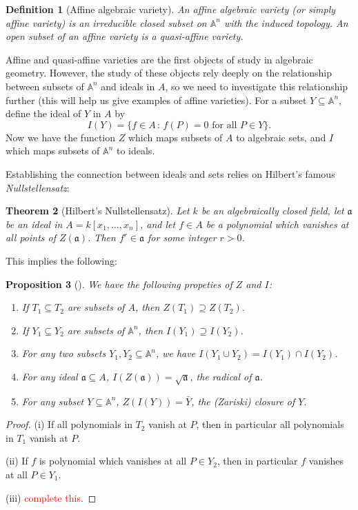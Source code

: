 \documentclass[12pt]{amsart}
\newcommand{\An}{\mathbb{A}^n}
\renewcommand{\a}{\mathfrak{a}}
\newtheorem{theorem}{Theorem}%
\newtheorem{definition}[theorem]{Definition}
\newtheorem{proposition}[theorem]{Proposition}
\theoremstyle{remark}
\theoremstyle{remark}
\begin{document}
\begin{definition}[Affine algebraic variety]
An affine algebraic variety (or simply affine variety) is an irreducible closed subset on $\An$ with the induced topology.
An open subset of an affine variety is a quasi-affine variety.
\end{definition}

Affine and quasi-affine varieties are the first objects of study in algebraic geometry.
However, the study of these objects rely deeply on the relationship between subsets of $\An$ and ideals in $A$, so we need to investigate this relationship further (this will help us give examples of affine varieties).
For a subset $Y \subseteq \An$, define the ideal of $Y$ in $A$ by
$$I(Y) = \{f \in A \, : \, f(P) = 0 \text{ for all } P \in Y\}.$$
Now we have the function $Z$ which maps subsets of $A$ to algebraic sets, and $I$ which maps subsets of $\An$ to ideals.

Establishing the connection between ideals and sets relies on Hilbert's famous \emph{Nullstellensatz}:

\begin{theorem}[Hilbert's Nullstellensatz]
Let $k$ be an algebraically closed field, let $\a$ be an ideal in $A = k[x_1, \dots, x_n]$, and let $f \in A$ be a polynomial which vanishes at all points of $Z(\a)$.
Then $f^r \in \a$ for some integer $r > 0$.
\end{theorem}

This implies the following:

\begin{proposition}[{\cite[Prop 1.2]{Hartshorne77}}]
We have the following propeties of $Z$ and $I$:
\begin{enumerate}[label=(\roman*)]
\item
If $T_1 \subseteq T_2$ are subsets of $A$, then $Z(T_1) \supseteq Z(T_2)$.

\item
If $Y_1 \subseteq Y_2$ are subsets of $\An$, then $I(Y_1) \supseteq I(Y_2)$.

\item
For any two subsets $Y_1, Y_2 \subseteq \An$, we have $I(Y_1 \cup Y_2) = I(Y_1) \cap I(Y_2)$.

\item
For any ideal $\a \subseteq A$, $I(Z(\a)) = \sqrt{\a}$, the radical of $\a$.

\item
For any subset $Y \subseteq \An$, $Z(I(Y)) = \bar Y$, the (Zariski) closure of $Y$.
\end{enumerate}
\end{proposition}
\begin{proof}
(i) If all polynomials in $T_2$ vanish at $P$, then in particular all polynomials in $T_1$ vanish at $P$.

(ii) If $f$ is polynomial which vanishes at all $P \in Y_2$, then in particular $f$ vanishes at all $P \in Y_1$.

(iii) \textcolor{red}{complete this}.
\end{proof}
\end{document}
